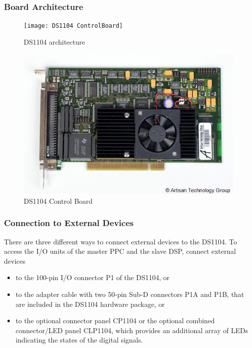 \subsubsection{Board Architecture}

\begin{figure}[h]
    \centering
    \begin{minipage}{0.49\textwidth}
    \centering
    \texttt{[image: DS1104 ControlBoard]}
    \caption{DS1104 architecture}
    \label{fig:Fig1}
    \end{minipage}
    \hfill
    \centering
    \begin{minipage}{0.49\textwidth}
    \centering
    \includegraphics[width=1\textwidth]{Images/Upper_View}
    \caption{DS1104 Control Board}
    \label{fig:Fig2}
    \end{minipage}
\end{figure}

\subsubsection{Connection to External Devices}
There are three different ways to connect external devices to the DS1104. To access the I/O units of the master PPC and the slave DSP, connect external devices
\begin{itemize}
    \item to the 100-pin I/O connector P1 of the DS1104, or
    \item to the adapter cable with two 50-pin Sub-D connectors P1A and P1B, that are included in the DS1104 hardware package, or
    \item to the optional connector panel CP1104 or the optional combined connector/LED panel CLP1104, which provides an additional array of LEDs indicating the states of the digital signals.
\end{itemize}
